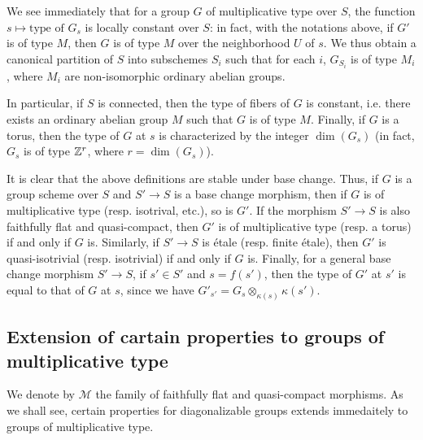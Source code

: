 \begin{remark}\label{scheme group multiplicative partiton base remark}
We see immediately that for a group $G$ of multiplicative type over $S$, the function $s\mapsto\text{type of $G_s$}$ is locally constant over $S$: in fact, with the notations above, if $G'$ is of type $M$, then $G$ is of type $M$ over the neighborhood $U$ of $s$. We thus obtain a canonical partition of $S$ into subschemes $S_i$ such that for each $i$, $G_{S_i}$ is of type $M_i$, where $M_i$ are non-isomorphic ordinary abelian groups.\par
In particular, if $S$ is connected, then the type of fibers of $G$ is constant, i.e. there exists an ordinary abelian group $M$ such that $G$ is of type $M$. Finally, if $G$ is a torus, then the type of $G$ at $s$ is characterized by the integer $\dim(G_s)$ (in fact, $G_s$ is of type $\mathbb{Z}^r$, where $r=\dim(G_s)$).
\end{remark}

\begin{remark}
It is clear that the above definitions are stable under base change. Thus, if $G$ is a group scheme over $S$ and $S'\to S$ is a base change morphism, then if $G$ is of multiplicative type (resp. isotrival, etc.), so is $G'$. If the morphism $S'\to S$ is also faithfully flat and quasi-compact, then $G'$ is of multiplicative type (resp. a torus) if and only if $G$ is. Similarly, if $S'\to S$ is \'etale (resp. finite \'etale), then $G'$ is quasi-isotrivial (resp. isotrivial) if and only if $G$ is. Finally, for a general base change morphism $S'\to S$, if $s'\in S'$ and $s=f(s')$, then the type of $G'$ at $s'$ is equal to that of $G$ at $s$, since we have $G'_{s'}=G_s\otimes_{\kappa(s)}\kappa(s')$.
\end{remark}

\subsection{Extension of cartain properties to groups of multiplicative type}
We denote by $\mathcal{M}$ the family of faithfully flat and quasi-compact morphisms. As we shall see, certain properties for diagonalizable groups extends immedaitely to groups of multiplicative type.

